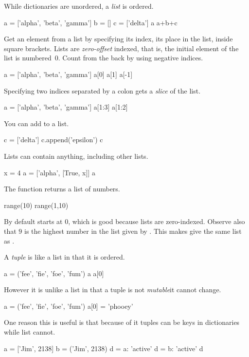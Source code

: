 While dictionaries are unordered, a \textit{list} is ordered.
\begin{pythonoutput}
a = ['alpha', 'beta', 'gamma']
b = []
c = ['delta']
a
a+b+c
\end{pythonoutput}
\noindent
Get an element from a list by specifying its index, its place in the list,
inside square brackets.
Lists are \textit{zero-offset} indexed, that is, the initial element of the
list is numbered~$0$.
Count from the back by using negative indices.
\begin{pythonoutput}[d,0,1]
a = ['alpha', 'beta', 'gamma']
a[0]
a[1]
a[-1]
\end{pythonoutput}
\noindent
Specifying two indices separated by a colon gets a \textit{slice} 
of the list. 
\begin{pythonoutput}[d,0,1]
a = ['alpha', 'beta', 'gamma']
a[1:3]
a[1:2]
\end{pythonoutput}
\noindent
You can add to a list.
\begin{pythonoutput}[d,0,1]
c = ['delta']
c.append('epsilon')
c
\end{pythonoutput}
\noindent
Lists can contain anything, including other lists.
\begin{pythonoutput}
x = 4
a = ['alpha', [True, x]]
a
\end{pythonoutput}

The function  returns a list of numbers.
\begin{pythonoutput}
range(10)
range(1,10)
\end{pythonoutput}
\noindent
By default  starts at $0$, which
is good because lists are zero-indexed.
Observe also that $9$ is the highest number in the list
given by .
This makes  give 
the same list as .

A \textit{tuple} is like a list in that it is ordered.
\begin{pythonoutput}
a = ('fee', 'fie', 'foe', 'fum')
a
a[0]
\end{pythonoutput}
\noindent
However it is unlike a list 
in that a tuple is not \textit{mutable}\Dash it cannot change.
\begin{pythonoutput}[d,0,1]
a = ('fee', 'fie', 'foe', 'fum')
a[0] = 'phooey'
\end{pythonoutput}
\noindent
One reason this is useful is that because of it
tuples can be keys in dictionaries while
list cannot.
\begin{pythonoutput}
a = ['Jim', 2138]
b = ('Jim', 2138)
d = {a: 'active'}
d = {b: 'active'}
d
\end{pythonoutput}

